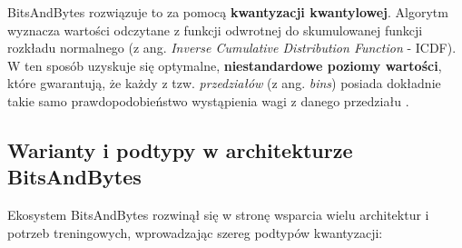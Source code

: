 BitsAndBytes rozwiązuje to za pomocą \textbf{kwantyzacji kwantylowej}. Algorytm wyznacza wartości odczytane z funkcji odwrotnej do skumulowanej funkcji rozkładu normalnego (z ang. \textit{Inverse Cumulative Distribution Function} - ICDF). W ten sposób uzyskuje się optymalne, \textbf{niestandardowe poziomy wartości}, które gwarantują, że każdy z tzw. \textit{przedziałów} (z ang. \textit{bins}) posiada dokładnie takie samo prawdopodobieństwo wystąpienia wagi z danego przedziału \cite{dettmers2023qlora,dettmers2022llmint8}.

\subsection{Warianty i podtypy w architekturze BitsAndBytes}

Ekosystem BitsAndBytes rozwinął się w stronę wsparcia wielu architektur i potrzeb treningowych, wprowadzając szereg podtypów kwantyzacji:

